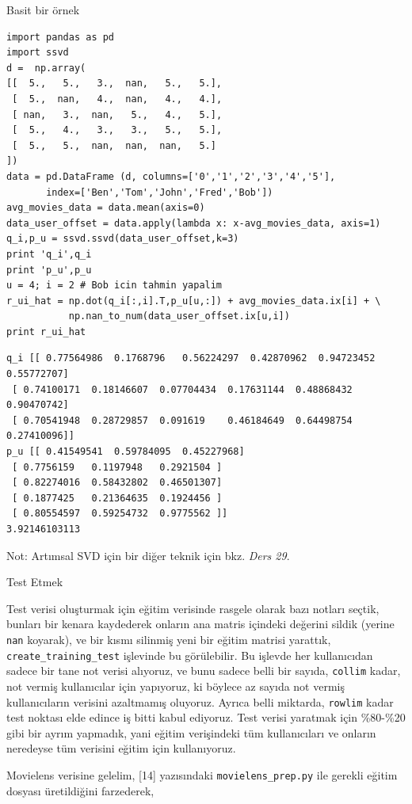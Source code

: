 \documentclass[12pt,fleqn]{article}\usepackage{../../common}
\begin{document}
Basit bir örnek

\begin{verbatim}
import pandas as pd
import ssvd
d =  np.array(
[[  5.,   5.,   3.,  nan,   5.,   5.],
 [  5.,  nan,   4.,  nan,   4.,   4.],
 [ nan,   3.,  nan,   5.,   4.,   5.],
 [  5.,   4.,   3.,   3.,   5.,   5.],
 [  5.,   5.,  nan,  nan,  nan,   5.]
])
data = pd.DataFrame (d, columns=['0','1','2','3','4','5'],
       index=['Ben','Tom','John','Fred','Bob'])
avg_movies_data = data.mean(axis=0)
data_user_offset = data.apply(lambda x: x-avg_movies_data, axis=1)
q_i,p_u = ssvd.ssvd(data_user_offset,k=3)
print 'q_i',q_i
print 'p_u',p_u
u = 4; i = 2 # Bob icin tahmin yapalim
r_ui_hat = np.dot(q_i[:,i].T,p_u[u,:]) + avg_movies_data.ix[i] + \
           np.nan_to_num(data_user_offset.ix[u,i])
print r_ui_hat
\end{verbatim}

\begin{verbatim}
q_i [[ 0.77564986  0.1768796   0.56224297  0.42870962  0.94723452  0.55772707]
 [ 0.74100171  0.18146607  0.07704434  0.17631144  0.48868432  0.90470742]
 [ 0.70541948  0.28729857  0.091619    0.46184649  0.64498754  0.27410096]]
p_u [[ 0.41549541  0.59784095  0.45227968]
 [ 0.7756159   0.1197948   0.2921504 ]
 [ 0.82274016  0.58432802  0.46501307]
 [ 0.1877425   0.21364635  0.1924456 ]
 [ 0.80554597  0.59254732  0.9775562 ]]
3.92146103113
\end{verbatim}

Not: Artımsal SVD için bir diğer teknik için bkz. {\em Ders 29}. 

Test Etmek

Test verisi oluşturmak için eğitim verisinde rasgele olarak bazı notları seçtik,
bunları bir kenara kaydederek onların ana matris içindeki değerini sildik
(yerine \verb!nan!  koyarak), ve bir kısmı silinmiş yeni bir eğitim matrisi
yarattık, \verb!create_training_test! işlevinde bu görülebilir. Bu işlevde her
kullanıcıdan sadece bir tane not verisi alıyoruz, ve bunu sadece belli bir
sayıda, \verb!collim! kadar, not vermiş kullanıcılar için yapıyoruz, ki böylece
az sayıda not vermiş kullanıcıların verisini azaltmamış oluyoruz. Ayrıca belli
miktarda, \verb!rowlim! kadar test noktası elde edince iş bitti kabul
ediyoruz. Test verisi yaratmak için \%80-\%20 gibi bir ayrım yapmadık, yani
eğitim verişindeki tüm kullanıcıları ve onların neredeyse tüm verisini eğitim
için kullanıyoruz.

Movielens verisine gelelim, [14] yazısındaki \verb!movielens_prep.py! ile
gerekli eğitim dosyası üretildiğini farzederek,
\end{document}
